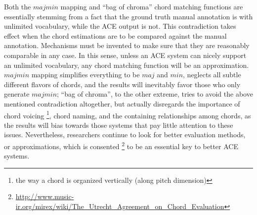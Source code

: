 Both the $majmin$ mapping and ``bag of chroma'' chord matching functions are essentially stemming from a fact that the ground truth manual annotation is with unlimited vocabulary, while the ACE output is not. This contradiction takes effect when the chord estimations are to be compared against the manual annotation. Mechanisms must be invented to make sure that they are reasonably comparable in any case. In this sense, unless an ACE system can nicely support an unlimited vocabulary, any chord matching function will be an approximation. $majmin$ mapping simplifies everything to be $maj$ and $min$, neglects all subtle different flavors of chords, and the results will inevitably favor those who only generate $majmin$; ``bag of chroma'', to the other extreme, tries to avoid the above mentioned contradiction altogether, but actually disregards the importance of chord voicing \footnote{the way a chord is organized vertically (along pitch dimension)}, chord naming, and the containing relationships among chords, as the results will bias towards those systems that pay little attention to these issues. Nevertheless, researchers continue to look for better evaluation methods, or approximations, which is consented \footnote{\url{http://www.music-ir.org/mirex/wiki/The\_Utrecht\_Agreement\_on\_Chord\_Evaluation}} to be an essential key to better ACE systems.

